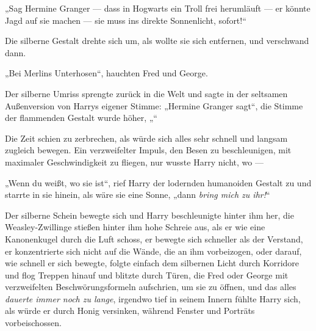 „Sag Hermine Granger — dass in Hogwarts ein Troll frei herumläuft — er könnte Jagd auf sie machen — sie muss ins direkte Sonnenlicht, sofort!“

Die silberne Gestalt drehte sich um, als wollte sie sich entfernen, und verschwand dann.

„Bei Merlins Unterhosen“, hauchten Fred und George.

Der silberne Umriss sprengte zurück in die Welt und sagte in der seltsamen Außenversion von Harrys eigener Stimme:
„Hermine Granger sagt“, die Stimme der flammenden Gestalt wurde höher, „“

Die Zeit schien zu zerbrechen, als würde sich alles sehr schnell und langsam zugleich bewegen. Ein verzweifelter Impuls, den Besen zu beschleunigen, mit maximaler Geschwindigkeit zu fliegen, nur wusste Harry nicht, wo —

„Wenn du weißt, wo sie ist“, rief Harry der lodernden humanoiden Gestalt zu und starrte in sie hinein, als wäre sie eine Sonne, „dann \emph{bring mich zu ihr!}“

Der silberne Schein bewegte sich und Harry beschleunigte hinter ihm her, die Weasley-Zwillinge stießen hinter ihm hohe Schreie aus, als er wie eine Kanonenkugel durch die Luft schoss, er bewegte sich schneller als der Verstand, er konzentrierte sich nicht auf die Wände, die an ihm vorbeizogen, oder darauf, wie schnell er sich bewegte, folgte einfach dem silbernen Licht durch Korridore und flog Treppen hinauf und blitzte durch Türen, die Fred oder George mit verzweifelten Beschwörungsformeln aufschrien, um sie zu öffnen, und das alles \emph{dauerte immer noch zu lange}, irgendwo tief in seinem Innern fühlte Harry sich, als würde er durch Honig versinken, während Fenster und Porträts vorbeischossen.

